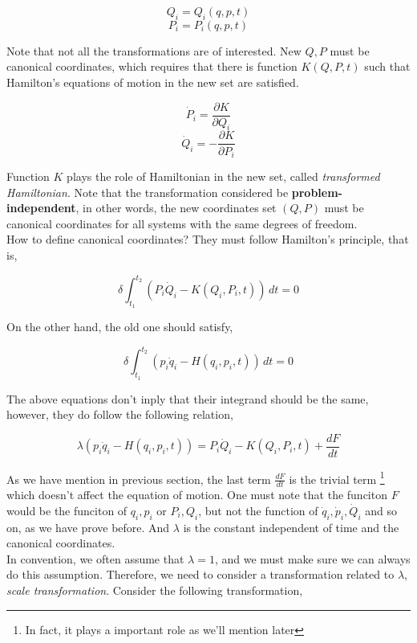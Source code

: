 \documentclass[12pt]{article}
\numberwithin{equation}{section}
\begin{document}
\begin{center}
    \[ Q_i = Q_i(q, p, t) \]
    \[ P_i = P_i(q, p, t) \]
\end{center}

Note that not all the transformations are of interested. New $Q, P$ must be canonical coordinates, which requires that there is function $K(Q, P, t)$ such that Hamilton's equations of motion in the new set are satisfied.

\begin{center}
    \[ \dot{P}_i = \frac{\partial K}{\partial Q_i} \]
    \[ \dot{Q}_i = - \frac{\partial K}{\partial P_i} \]
\end{center}

Function $K$ plays the role of Hamiltonian in the new set, called \textit{transformed Hamiltonian}. Note that the transformation considered be \textbf{problem-independent}, in other words, the new coordinates set $(Q,P)$ must be canonical coordinates for all systems with the same degrees of freedom.
\\
How to define canonical coordinates? They must follow Hamilton's principle, that is,

\begin{center}
    \[ \delta \int_{t_1}^{t_2} \left( P_i\dot{Q}_i - K(Q_i, P_i, t) \right) \, dt = 0 \]
\end{center}

On the other hand, the old one should satisfy, 

\begin{center}
    \[ \delta \int_{t_1}^{t_2} \left( p_i\dot{q}_i - H(q_i, p_i, t) \right) \, dt = 0 \]
\end{center}

The above equations don't inply that their integrand should be the same, however, they do follow the following relation,

\begin{center}
    \[ \lambda \left(p_i\dot{q}_i - H(q_i, p_i, t) \right) = P_i\dot{Q}_i - K(Q_i, P_i, t) + \frac{dF}{dt} \]
\end{center}

As we have mention in previous section, the last term $\frac{dF}{dt}$ is the trivial term \footnote{In fact, it plays a important role as we'll mention later} which doesn't affect the equation of motion. One must note that the funciton $F$ would be the funciton of $q_i, p_i$ or $P_i, Q_i$, but not the function of $\dot{q}_i, \dot{p}_i, \dot{Q}_i$ and so on, as we have prove before. And $\lambda$ is the constant independent of time and the canonical coordinates.
\\
\indent In convention, we often assume that $\lambda = 1$, and we must make sure we can always do this assumption. Therefore, we need to consider a transformation related to $\lambda$, \textit{scale transformation}. Consider the following transformation, 
\end{document}
